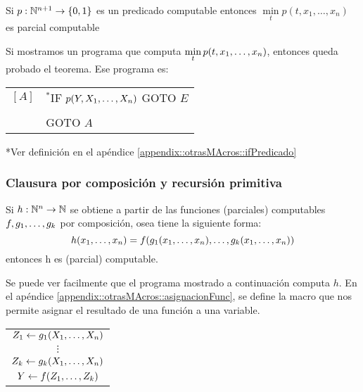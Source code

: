 		\begin{teorema}\label{teorema::MinNoAcotadoEsComputable}
Si $p:\mathbb{N}^{n+1}\to\{0,1\}$ es un predicado computable entonces $\min\limits_t p(t,x_1,\dots,x_n)$ es parcial computable
	\end{teorema}
	
	\begin{demo}
		Si mostramos un programa que computa $\min\limits_t p(t,x_1,\dots, x_{n})$, entonces queda probado el teorema. Ese programa es:
		
		\vspace*{5mm}
		\begin{center}
		\begin{tabular}{ll}
	$[A]$ & $^*$IF $p(Y,X_1,\dots, X_{n})$ GOTO $E$ \\
	& \sincr{Y} \\
	& GOTO $A$
\end{tabular}
		\end{center}
	
	\vspace*{5mm}
	*Ver definición en el apéndice \ref{appendix::otrasMAcros::ifPredicado}
	\end{demo}

\subsubsection{Clausura por composición y recursión primitiva}

\begin{teorema}\label{teorema::computableClausuraComposicion}
Si $h:\mathbb{N}^n\to\mathbb{N}$ se obtiene a partir de las funciones (parciales) computables $f,g_1,\dots, g_{k}$ por composición, osea tiene la siguiente forma:
	$$h(x_1,\dots, x_{n}) = f(g_1(x_1,\dots, x_{n}),\dots,g_k(x_1,\dots, x_{n}))$$
entonces h es (parcial) computable.
\end{teorema}

\begin{demo}
	Se puede  ver facilmente que el programa mostrado a continuación computa $h$. En el apéndice \ref{appendix::otrasMAcros::asignacionFunc}, se define la macro que nos permite asignar el resultado de una función a una variable.
	
	\begin{center}
	\begin{tabular}{c}
		$Z_1 \leftarrow g_1(X_1,\dots, X_{n})$ \\
		$\vdots$ \\
		$Z_k \leftarrow g_k(X_1,\dots, X_{n})$ \\
		$Y \leftarrow f(Z_1,\dots, Z_{k})$\\
	\end{tabular}
\end{center}
\end{demo}

